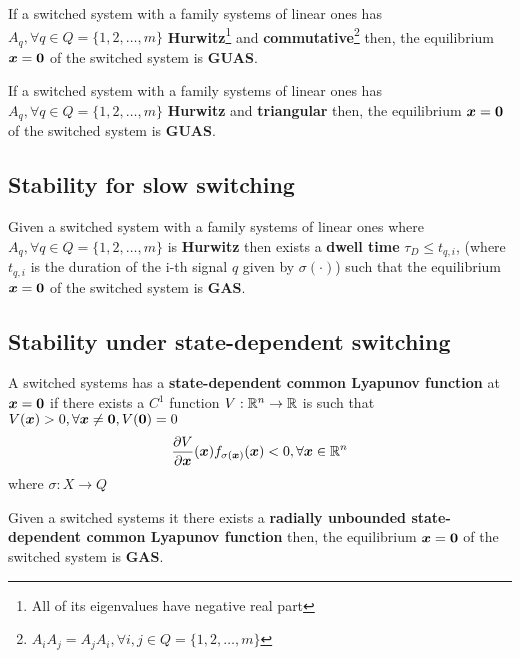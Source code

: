 \begin{theorem}
	If a switched system with a family systems of linear ones has $A_q, \forall q \in Q = \{1,2,\dots,m\}$ \textbf{Hurwitz}\footnote{All of its eigenvalues have negative real part} and \textbf{commutative}\footnote{$A_i A_j = A_j A_i, \forall i,j \in Q = \{1,2,\dots,m\}$} then, the equilibrium $\boldsymbol{x}=\boldsymbol{0}$ of the switched system is \textbf{GUAS}.
\end{theorem}

\begin{theorem}
	If a switched system with a family systems of linear ones has $A_q, \forall q \in Q = \{1,2,\dots,m\}$ \textbf{Hurwitz} and \textbf{triangular} then, the equilibrium $\boldsymbol{x}=\boldsymbol{0}$ of the switched system is \textbf{GUAS}.
\end{theorem}

\subsection{Stability for slow switching}

\begin{theorem}
	Given a switched system with a family systems of linear ones where $A_q, \forall q \in Q = \{1,2,\dots,m\}$ is \textbf{Hurwitz} then exists a \textbf{dwell time} $\tau_D \leq t_{q,i}$, (where $t_{q,i}$ is the duration of the i-th signal $q$ given by $\sigma(\cdot)$) such that the equilibrium $\boldsymbol{x}=\boldsymbol{0}$ of the switched system is \textbf{GAS}.
\end{theorem}

\subsection{Stability under state-dependent switching}

\begin{definition}
	A switched systems has a \textbf{state-dependent common Lyapunov function} at $\boldsymbol{x}=\boldsymbol{0}$ if there exists a $C^1$ function $V: \mathbb{R}^n \to \mathbb{R}$ is such that $V(\boldsymbol{x}) > 0, \forall \boldsymbol{x} \neq \boldsymbol{0}, V(\boldsymbol{0}) = 0$
	\[
		\frac{\partial V}{\partial \boldsymbol{x}}(\boldsymbol{x}) f_{\sigma(\boldsymbol{x})}(\boldsymbol{x}) < 0, \forall \boldsymbol{x} \in \mathbb{R}^n
	\]
	where $\sigma : X \to Q$
\end{definition}

\begin{theorem}
	Given a switched systems it there exists a \textbf{radially unbounded state-dependent common Lyapunov function} then, the equilibrium $\boldsymbol{x}=\boldsymbol{0}$ of the switched system is \textbf{GAS}.
\end{theorem}

